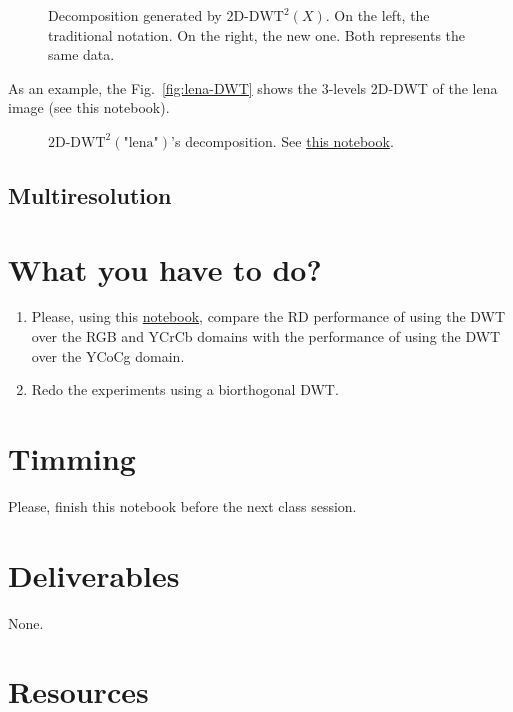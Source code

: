 \begin{figure}
  \centering
  \caption{Decomposition generated by $\text{2D-DWT}^2(X)$. On the
    left, the traditional notation. On the right, the new one. Both
    represents the same data.}
  \label{fig:2D-DWT}
\end{figure}

As an example, the Fig.~\ref{fig:lena-DWT} shows the $3$-levels
2D-DWT of the lena image (see this notebook).

\begin{figure}
  \centering
  \caption{$\text{2D-DWT}^2(\text{"lena"})$'s decomposition. See
    \href{https://github.com/Sistemas-Multimedia/Sistemas-Multimedia.github.io/blob/master/study_guide/06-2D-DWT/dwt_lena.ipynb}{this
      notebook}.}
  \label{fig:2D-DWT}
\end{figure}

\subsection{Multiresolution}

\section{What you have to do?}

\begin{enumerate}
\item Please, using this
  \href{https://github.com/Sistemas-Multimedia/Sistemas-Multimedia.github.io/blob/master/study_guide/07-DWT/performance.ipynb}{notebook},
  compare the RD performance of using the DWT over the RGB and YCrCb
  domains with the performance of using the DWT over the YCoCg domain.
\item Redo the experiments using a biorthogonal DWT.
\end{enumerate}

\section{Timming}

Please, finish this notebook before the next class session.

\section{Deliverables}

None.

\section{Resources}


